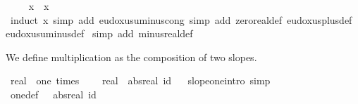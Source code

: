 \begin{isabellebody}
\ \ \isamarkupfalse%
\ {\isachardoublequoteopen}{\isacharminus}{\kern0pt}\ x\ {\isacharplus}{\kern0pt}\ x\ {\isacharequal}{\kern0pt}\ {}{\isachardoublequoteclose}\ \isamarkupfalse%
\ {\isacharparenleft}{\kern0pt}induct\ x{\isacharparenright}{\kern0pt}\ {\isacharparenleft}{\kern0pt}simp\ add{\isacharcolon}{\kern0pt}\ eudoxus{\isacharunderscore}{\kern0pt}uminus{\isacharunderscore}{\kern0pt}cong{\isacharcomma}{\kern0pt}\ simp\ add{\isacharcolon}{\kern0pt}\ zero{\isacharunderscore}{\kern0pt}real{\isacharunderscore}{\kern0pt}def\ eudoxus{\isacharunderscore}{\kern0pt}plus{\isacharunderscore}{\kern0pt}def\ eudoxus{\isacharunderscore}{\kern0pt}uminus{\isacharunderscore}{\kern0pt}def{\isacharparenright}{\kern0pt}\isanewline
{}\isamarkupfalse%
\ {\isacharparenleft}{\kern0pt}simp\ add{\isacharcolon}{\kern0pt}\ minus{\isacharunderscore}{\kern0pt}real{\isacharunderscore}{\kern0pt}def{\isacharparenright}{\kern0pt}%
\endisatagproof
{\isafoldproof}%
%
\isadelimproof
%
\endisadelimproof
%
\isadelimdocument
%
\endisadelimdocument
%
\isatagdocument
%
\isamarkuptrue%
%
\endisatagdocument
{\isafolddocument}%
%
\isadelimdocument
%
\endisadelimdocument
%
\begin{isamarkuptext}%
We define multiplication as the composition of two slopes.%
\end{isamarkuptext}\isamarkuptrue%
\isamarkupfalse%
\ real\ {\isacharcolon}{\kern0pt}{\isacharcolon}{\kern0pt}\ {\isachardoublequoteopen}{\isacharbraceleft}{\kern0pt}one{\isacharcomma}{\kern0pt}\ times{\isacharbraceright}{\kern0pt}{\isachardoublequoteclose}\isanewline
{}\isanewline
\isanewline
{}\isamarkupfalse%
\isanewline
\ \ {\isachardoublequoteopen}{}\ {\isacharcolon}{\kern0pt}{\isacharcolon}{\kern0pt}\ real{\isachardoublequoteclose}\ \ {\isachardoublequoteopen}abs{\isacharunderscore}{\kern0pt}real\ id{\isachardoublequoteclose}%
\isadelimproof
\ %
\endisadelimproof
%
\isatagproof
\isacommand{{\isachardot}{\kern0pt}}\isamarkupfalse%
%
\endisatagproof
{\isafoldproof}%
%
\isadelimproof
%
\endisadelimproof
\isanewline
\isanewline
{}\isamarkupfalse%
\ slope{\isacharunderscore}{\kern0pt}one{\isacharbrackleft}{\kern0pt}intro{\isacharbang}{\kern0pt}{\isacharcomma}{\kern0pt}\ simp{\isacharbrackright}{\kern0pt}\isanewline
\isanewline
{}\isamarkupfalse%
\ one{\isacharunderscore}{\kern0pt}def{\isacharcolon}{\kern0pt}\ {\isachardoublequoteopen}{}\ {\isacharequal}{\kern0pt}\ abs{\isacharunderscore}{\kern0pt}real\ id{\isachardoublequoteclose}%

\end{isabellebody}
